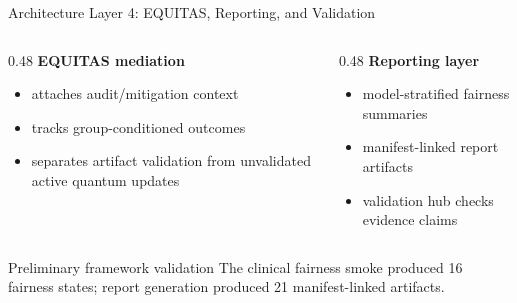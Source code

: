 \documentclass[aspectratio=169,10pt]{beamer}
\begin{document}
\begin{frame}{Architecture Layer 4: EQUITAS, Reporting, and Validation}
\begin{columns}[T]
\begin{column}{0.48\textwidth}
\textbf{EQUITAS mediation}
\begin{itemize}
    \item attaches audit/mitigation context
    \item tracks group-conditioned outcomes
    \item separates artifact validation from unvalidated active quantum updates
\end{itemize}
\end{column}
\begin{column}{0.48\textwidth}
\textbf{Reporting layer}
\begin{itemize}
    \item model-stratified fairness summaries
    \item manifest-linked report artifacts
    \item validation hub checks evidence claims
\end{itemize}
\end{column}
\end{columns}

\vspace{0.6em}
\begin{block}{Preliminary framework validation}
The clinical fairness smoke produced 16 fairness states; report generation produced 21 manifest-linked artifacts.
\end{block}
\end{frame}
\end{document}

